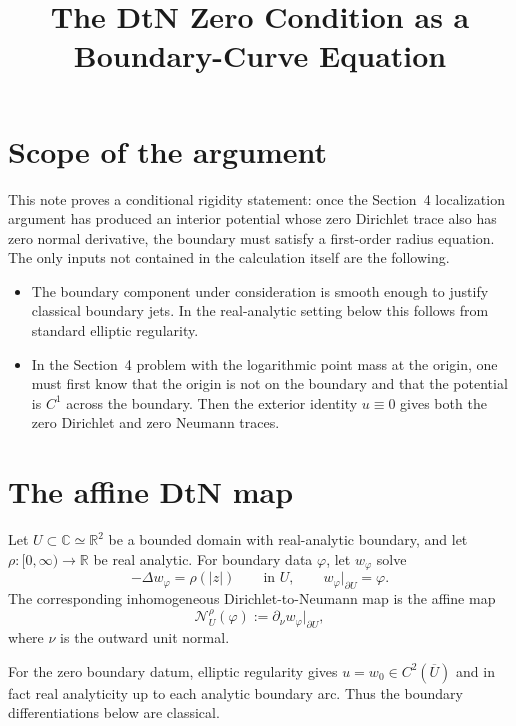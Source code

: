 \documentclass[11pt]{article}
\title{The DtN Zero Condition as a Boundary-Curve Equation}
\author{}
\date{}
\newcommand{\C}{\mathbb C}
\newcommand{\R}{\mathbb R}
\newcommand{\1}{\mathbf 1}
\begin{document}
\maketitle

\section{Scope of the argument}

This note proves a conditional rigidity statement: once the Section~4
localization argument has produced an interior potential whose zero Dirichlet
trace also has zero normal derivative, the boundary must satisfy a first-order
radius equation.  The only inputs not contained in the calculation itself are
the following.

\begin{itemize}
\item The boundary component under consideration is smooth enough to justify
classical boundary jets.  In the real-analytic setting below this follows from
standard elliptic regularity.
\item In the Section~4 problem with the logarithmic point mass at the origin, one
must first know that the origin is not on the boundary and that the potential is
\(C^1\) across the boundary.  Then the exterior identity \(u\equiv0\) gives both
the zero Dirichlet and zero Neumann traces.
\end{itemize}

\section{The affine DtN map}

Let \(U\subset\C\simeq\R^2\) be a bounded domain with real-analytic boundary, and
let \(\rho:[0,\infty)\to\R\) be real analytic.  For boundary data
\(\varphi\), let \(w_\varphi\) solve
\begin{equation}\label{eq:dirichlet-problem}
  -\Delta w_\varphi=\rho(|z|)
  \qquad\text{in }U,\qquad
  w_\varphi|_{\partial U}=\varphi .
\end{equation}
The corresponding inhomogeneous Dirichlet-to-Neumann map is the affine map
\[
  \mathcal N_U^\rho(\varphi):=\partial_\nu w_\varphi|_{\partial U},
\]
where \(\nu\) is the outward unit normal.

For the zero boundary datum, elliptic regularity gives \(u=w_0\in C^2(\overline U)\)
and in fact real analyticity up to each analytic boundary arc.  Thus the boundary
differentiations below are classical.
\end{document}

